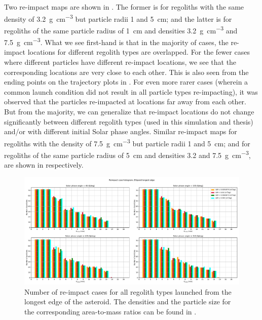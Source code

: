 Two re-impact maps are shown in . The former is for regoliths with the same density of \SI{3.2}{\gram\per\centi\metre\cubed} but particle radii 1 and \SI{5}{\centi\metre}; and the latter is for regoliths of the same particle radius of \SI{1}{\centi\metre} and densities \SI{3.2}{\gram\per\centi\metre\cubed} and \SI{7.5}{\gram\per\centi\metre\cubed}. What we see first-hand is that in the majority of cases, the re-impact locations for different regolith types are overlapped. For the fewer cases where different particles have different re-impact locations, we see that the corresponding locations are very close to each other. This is also seen from the ending points on the trajectory plots in . For even more rarer cases (wherein a common launch condition did not result in all particle types re-impacting), it was observed that the particles re-impacted at locations far away from each other. But from the majority, we can generalize that re-impact locations do not change significantly between different regolith types (used in this simulation and thesis) and/or with different initial Solar phase angles. Similar re-impact maps for regoliths with the density of \SI{7.5}{\gram\per\centi\metre\cubed} but particle radii 1 and \SI{5}{\centi\metre}; and for regoliths of the same particle radius of \SI{5}{\centi\metre} and densities 3.2 and \SI{7.5}{\gram\per\centi\metre\cubed}, are shown in  respectively.
\begin{figure}[htb]
\centering
\captionsetup{justification=centering}
\includegraphics[angle=90, width=\textwidth, height=\textheight, keepaspectratio=true]{longest_edge_perturbations/multiple_regolith_types/allPhases_reimpactCases.pdf}
\caption{Number of re-impact cases for all regolith types launched from the longest edge of the asteroid. The densities and the particle size for the corresponding area-to-mass ratios can be found in .}
\label{fig:longestEdge_allParticles_reimpact_hist}
\end{figure}
